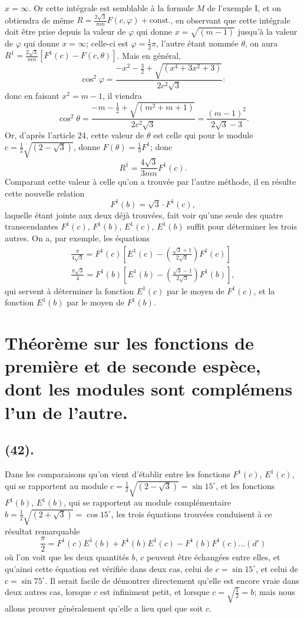 \documentclass{article}
\begin{document}
$x=\infty$. Or cette intégrale est semblable à la formule $M$ de l'exemple I, et on obtiendra de même $R=\frac{2\sqrt{3}}{mn}F(c,\varphi)+\text{const.}$, en observant que cette intégrale doit être prise depuis la valeur de $\varphi$ qui donne $x=\sqrt{(m-1)}$ jusqu'à la valeur de $\varphi$ qui donne $x=\infty$; celle-ci est $\varphi=\frac{1}{2}\pi$, l'autre étant nommée $\theta$, on aura $R^{1}=\frac{2\sqrt{3}}{mn}[F^{1}(c)-F(c,\theta)]$. Mais en général,
\[ \cos^{2}\varphi=\frac{-x^{2}-\frac{3}{2}+\sqrt{(x^{4}+3x^{2}+3)}}{2c^{2}\sqrt{3}}: \]
donc en faisant $x^{2}=m-1$, il viendra
\[ \cos^{2}\theta=\frac{-m-\frac{1}{2}+\sqrt{(m^{2}+m+1)}}{2c^{2}\sqrt{3}}=\frac{(m-1)^{2}}{2\sqrt{3}-3}. \]
Or, d'après l'article 24, cette valeur de $\theta$ est celle qui pour le module $c=\frac{1}{2}\sqrt{(2-\sqrt{3})}$, donne $F(\theta)=\frac{1}{3}F^{1}$; donc
\[ R^{1}=\frac{4\sqrt{3}}{3mn}F^{1}(c). \]
Comparant cette valeur à celle qu'on a trouvée par l'autre méthode, il en résulte cette nouvelle relation
\[ F^{1}(b)=\sqrt{3}\cdot F^{1}(c), \]
laquelle étant jointe aux deux déjà trouvées, fait voir qu'une seule des quatre transcendantes $F^{1}(c)$, $F^{1}(b)$, $E^{1}(c)$, $E^{1}(b)$ suffit pour déterminer les trois autres. On a, par exemple, les équations
\[ \begin{gathered} \frac{\pi}{4\sqrt{3}}=F^{1}(c)\left[E^{1}(c)-\left(\frac{\sqrt{3}+1}{2\sqrt{3}}\right)F^{1}(c)\right]\\ \frac{\pi\sqrt{3}}{4}=F^{1}(b)\left[E^{1}(b)-\left(\frac{\sqrt{3}-1}{2\sqrt{3}}\right)F^{1}(b)\right], \end{gathered} \]
qui servent à déterminer la fonction $E^{1}(c)$ par le moyen de $F^{1}(c)$, et la fonction $E^{1}(b)$ par le moyen de $F^{1}(b)$.


\section*{Théorème sur les fonctions de première et de seconde espèce, dont les modules sont complémens l'un de l'autre.}

\subsection*{(42).}

Dans les comparaisons qu'on vient d'établir entre les fonctions $F^{1}(c)$, $E^{1}(c)$, qui se rapportent au module $c=\frac{1}{2}\sqrt{(2-\sqrt{3})}=\sin 15^{\circ}$, et les fonctions $F^{1}(b)$, $E^{1}(b)$, qui se rapportent au module complémentaire $b=\frac{1}{2}\sqrt{(2+\sqrt{3})}=\cos 15^{\circ}$, les trois équations trouvées conduisent à ce résultat remarquable
\[ \frac{\pi}{2}=F^{1}(c)E^{1}(b)+F^{1}(b)E^{1}(c)-F^{1}(b)F^{1}(c)\ldots(d') \]
où l'on voit que les deux quantités $b$, $c$ peuvent être échangées entre elles, et qu'ainsi cette équation est vérifiée dans deux cas, celui de $c=\sin 15^{\circ}$, et celui de $c=\sin 75^{\circ}$. Il serait facile de démontrer directement qu'elle est encore vraie dans deux autres cas, lorsque $c$ est infiniment petit, et lorsque $c=\sqrt{\frac{1}{2}}=b$; mais nous allons prouver généralement qu'elle a lieu quel que soit $c$.
\end{document}
